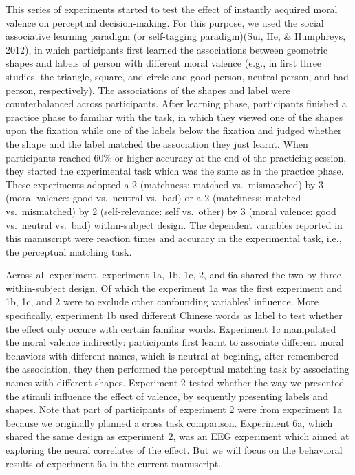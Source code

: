\documentclass[man]{apa6}
\begin{document}
This series of experiments started to test the effect of instantly acquired moral valence on perceptual decision-making. For this purpose, we used the social associative learning paradigm (or self-tagging paradigm)(Sui, He, \& Humphreys, 2012), in which participants first learned the associations between geometric shapes and labels of person with different moral valence (e.g., in first three studies, the triangle, square, and circle and good person, neutral person, and bad person, respectively). The associations of the shapes and label were counterbalanced across participants. After learning phase, participants finished a practice phase to familiar with the task, in which they viewed one of the shapes upon the fixation while one of the labels below the fixation and judged whether the shape and the label matched the association they just learnt. When participants reached 60\% or higher accuracy at the end of the practicing session, they started the experimental task which was the same as in the practice phase. These experiments adopted a 2 (matchness: matched vs.~mismatched) by 3 (moral valence: good vs.~neutral vs.~bad) or a 2 (matchness: matched vs.~mismatched) by 2 (self-relevance: self vs.~other) by 3 (moral valence: good vs.~neutral vs.~bad) within-subject design. The dependent variables reported in this manuscript were reaction times and accuracy in the experimental task, i.e., the perceptual matching task.

Across all experiment, experiment 1a, 1b, 1c, 2, and 6a shared the two by three within-subject design. Of which the experiment 1a was the first experiment and 1b, 1c, and 2 were to exclude other confounding variables' influence. More specifically, experiment 1b used different Chinese words as label to test whether the effect only occure with certain familiar words. Experiment 1c manipulated the moral valence indirectly: participants first learnt to associate different moral behaviors with different names, which is neutral at begining, after remembered the association, they then performed the perceptual matching task by associating names with different shapes. Experiment 2 tested whether the way we presented the stimuli influence the effect of valence, by sequently presenting labels and shapes. Note that part of participants of experiment 2 were from experiment 1a because we originally planned a cross task comparison. Experiment 6a, which shared the same design as experiment 2, was an EEG experiment which aimed at exploring the neural correlates of the effect. But we will focus on the behavioral results of experiment 6a in the current manuscript.
\end{document}
